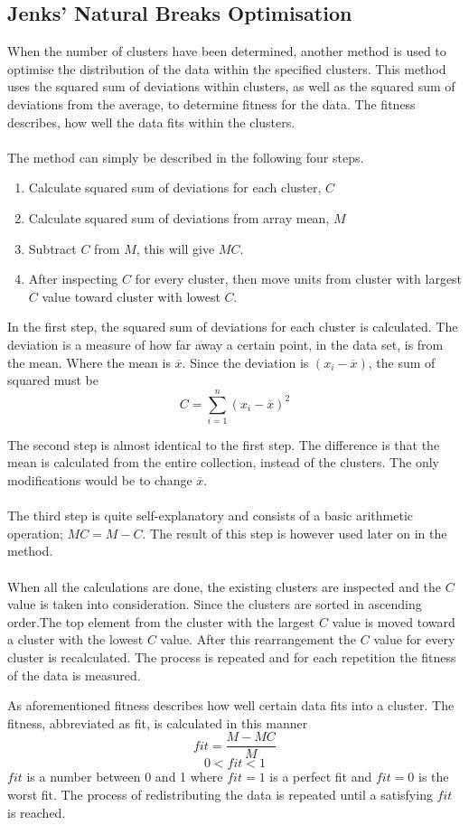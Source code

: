 \subsection{Jenks' Natural Breaks Optimisation}
\label{sub:jenks}
When the number of clusters have been determined, another method is used to optimise the distribution of the data within the specified clusters. This method uses the squared sum of deviations within clusters, as well as the squared sum of deviations from the average, to determine fitness for the data. The fitness describes, how well the data fits within the clusters.
\\\\
The method can simply be described in the following four steps.
\begin{enumerate}
  \item Calculate squared sum of deviations for each cluster, $C$
  \item Calculate squared sum of deviations from array mean, $M$
  \item Subtract $C$ from $M$, this will give $MC$.
  \item After inspecting $C$ for every cluster, then move units from cluster with largest $C$ value toward cluster with lowest $C$.
\end{enumerate}
In the first step, the squared sum of deviations for each cluster is calculated. The deviation is a measure of how far away a certain point, in the data set, is from the mean. Where the mean is $\overline{x}$. Since the deviation is $(x_i-\overline{x})$, the sum of squared must be $$C= \displaystyle\sum_{i=1}^{n}(x_i-\overline{x})^2$$

The second step is almost identical to the first step. The difference is that the mean is calculated from the entire collection, instead of the clusters. The only modifications would be to change $\overline{x}$.
\\\\
The third step is quite self-explanatory and consists of a basic arithmetic operation; $MC = M-C$. The result of this step is however used later on in the method.
\\\\
When all the calculations are done, the existing clusters are inspected and the $C$ value is taken into consideration. Since the clusters are sorted in ascending order.The top element from the cluster with the largest $C$ value is moved toward a cluster with the lowest $C$ value. After this rearrangement the $C$ value for every cluster is recalculated. The process is repeated and for each repetition the fitness of the data is measured.


As aforementioned fitness describes how well certain data fits into a cluster. The fitness, abbreviated as fit, is calculated in this manner $$fit = \frac{M-MC}{M}$$
$$0<fit<1$$
$fit$ is a number between 0 and 1 where $fit = 1$ is a perfect fit and $fit = 0$ is the worst fit.
The process of redistributing the data is repeated until a satisfying $fit$ is reached.
